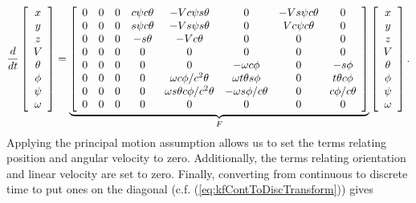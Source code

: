 {\footnotesize
\begin{align}
\label{eq:kfjacobianresult}
\frac{d}{dt}\left[\begin{array}{c}
x \\ y \\ z \\ V \\ \theta \\ \phi \\ \psi \\ \omega
\end{array}\right] =
\underbrace{\left[\begin{array}{c c c c c c c c}
0 & 0 & 0 & c\psi c\theta & -V c\psi s\theta               & 0                     & -V s\psi c\theta & 0 \\
0 & 0 & 0 & s\psi c\theta & -V s\psi s\theta               & 0                     & V c\psi c\theta  & 0 \\
0 & 0 & 0 & -s\theta      & -V c\theta                     & 0                     & 0                & 0 \\
0 & 0 & 0 & 0             & 0                              & 0                     & 0                & 0 \\
0 & 0 & 0 & 0             & 0                              & -\omega c\phi         & 0                & -s\phi \\
0 & 0 & 0 & 0             & \omega c\phi/c^2\theta         & \omega t\theta s\phi  & 0                & t\theta c\phi \\
0 & 0 & 0 & 0             & \omega s\theta c\phi/c^2\theta & -\omega s\phi/c\theta & 0                & c\phi/c\theta \\
0 & 0 & 0 & 0             & 0                              & 0                     & 0                & 0
\end{array}\right]}_{F}
\left[\begin{array}{c}
x \\ y \\ z \\ V \\ \theta \\ \phi \\ \psi \\ \omega
\end{array}\right].
\end{align}
}
Applying the principal motion assumption allows us to set the terms relating position and angular velocity to zero. Additionally, the terms relating orientation and linear velocity are set to zero. Finally, converting from continuous to discrete time to put ones on the diagonal (c.f. (\ref{eq:kfContToDiscTransform})) gives
